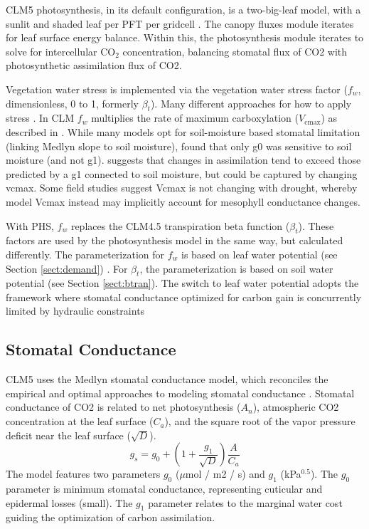 \documentclass[draft,linenumbers]{agujournal}
\begin{document}
    CLM5 photosynthesis, in its default configuration, is a two-big-leaf model, with a sunlit and shaded leaf per PFT per gridcell \citep{thornton2007, dai2004, oleson2013}. 
    The canopy fluxes module iterates for leaf surface energy balance.
    Within this, the photosynthesis module iterates to solve for intercellular CO$_2$ concentration, balancing stomatal flux of 
    CO2 with photosynthetic assimilation flux of CO2.
    
    Vegetation water stress is implemented via the vegetation water stress factor ($f_w$, dimensionless, 0 to 1, formerly $\beta_t$). 
    Many different approaches for how to apply stress \citep{zhou2013,novick2016a}.
    In CLM $f_w$ multiplies the rate of maximum carboxylation ($V_{\text{cmax}}$) as described in \citet{oleson2013}.
    While many models opt for soil-moisture based stomatal limitation (linking Medlyn slope to soil moisture),
    \cite{lin2018} found that only g0 was sensitive to soil moisture (and not g1).
    \cite{zhou2013} suggests that changes in assimilation tend to exceed those predicted by a g1 connected to soil moisture, but could be captured by changing vcmax.
    Some field studies suggest Vcmax is not changing with drought, whereby model Vcmax instead may implicitly account for mesophyll conductance changes.
    
    With PHS, $f_w$ replaces the CLM4.5 transpiration beta function ($\beta_t$). 
    These factors are used by the photosynthesis model in the same way, but calculated differently. 
    The parameterization for $f_w$ is based on leaf water potential (see Section \ref{sect:demand}) . 
    For $\beta_t$, the parameterization is based on soil water potential (see Section \ref{sect:btran}).
    The switch to leaf water potential adopts the framework where stomatal conductance optimized for carbon gain is concurrently limited by hydraulic constraints \citep{novick2016a}


\subsection{Stomatal Conductance}
\label{sect:gs}
    CLM5 uses the Medlyn stomatal conductance model, which reconciles the empirical and optimal approaches to modeling 
    stomatal conductance \citep{medlyn2011}. 
    Stomatal conductance of CO2 is related to net photosynthesis ($A_n$), atmospheric CO2 concentration at the leaf surface 
    ($C_a$), and the square root of the vapor pressure deficit near the leaf surface ($\sqrt{D}$).
    \begin{equation}
    g_s=g_0+\left(1+\dfrac{g_1}{\sqrt{D}}\right)\dfrac{A}{C_a}
    \end{equation}
    The model features two parameters $g_0$ ($\mu$mol / m2 / s) and $g_1$ (kPa$^{0.5}$). 
    The $g_0$ parameter is minimum stomatal conductance, representing cuticular and epidermal losses (small). 
    The $g_1$ parameter relates to the marginal water cost guiding the optimization of carbon assimilation.
    
\end{document}
